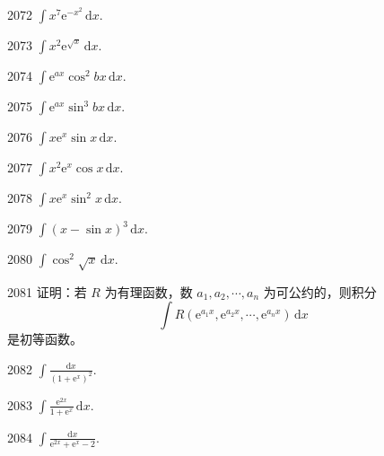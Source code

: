 \begin{prob}[S]{2072}
$\int x^7 \mathrm{e}^{-x^2}\,\mathrm{d}x$.
\end{prob}

\begin{prob}[S]{2073}
$\int x^2 \mathrm{e}^{\sqrt{x}}\,\mathrm{d}x$.
\end{prob}

\begin{prob}[S]{2074}
$\int \mathrm{e}^{ax} \cos^2 bx \,\mathrm{d}x$.
\end{prob}

\begin{prob}[S]{2075}
$\int \mathrm{e}^{ax} \sin^3 bx \,\mathrm{d}x$.
\end{prob}

\begin{prob}[S]{2076}
$\int x \mathrm{e}^x \sin x \,\mathrm{d}x$.
\end{prob}

\begin{prob}[S]{2077}
$\int x^2 \mathrm{e}^x \cos x \,\mathrm{d}x$.
\end{prob}

\begin{prob}[S]{2078}
$\int x \mathrm{e}^x \sin^2 x \,\mathrm{d}x$.
\end{prob}

\begin{prob}[S]{2079}
$\int (x - \sin x)^3 \,\mathrm{d}x$.
\end{prob}

\begin{prob}[S]{2080}
$\int \cos^2 \sqrt{x}\,\mathrm{d}x$.
\end{prob}

\begin{prob}[M]{2081}
证明：若 $R$ 为有理函数，数 $a_1, a_2, \cdots, a_n$ 为可公约的，则积分
\[
\int R(\mathrm{e}^{a_1 x}, \mathrm{e}^{a_2 x}, \cdots, \mathrm{e}^{a_n x})\,\mathrm{d}x
\]
是初等函数。
\end{prob}


\begin{prob}[S]{2082}
$\int \frac{\mathrm{d}x}{(1 + \mathrm{e}^x)^2}$.
\end{prob}

\begin{prob}[S]{2083}
$\int \frac{\mathrm{e}^{2x}}{1 + \mathrm{e}^x}\,\mathrm{d}x$.
\end{prob}

\begin{prob}[S]{2084}
$\int \frac{\mathrm{d}x}{\mathrm{e}^{2x} + \mathrm{e}^x - 2}$.
\end{prob}

